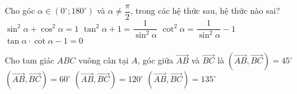 \begin{ex}%
Cho góc $\alpha \in \left(0^{\circ}; 180^{\circ} \right)$ và $\alpha \ne \dfrac{\pi}{2}$, trong các hệ thức sau, hệ thức nào sai?
\choice
{$\sin^2 \alpha + \cos ^2 \alpha =1$}
{\True $ \tan^2 \alpha + 1=\dfrac{1}{\sin^2 \alpha}$}
{$\cot^2 \alpha = \dfrac{1}{\sin^2 \alpha}-1$}
{$\tan \alpha \cdot \cot \alpha -1=0$}
\end{ex}
\begin{ex}%
Cho tam giác $ABC$ vuông cân tại $A$, góc giữa $\overrightarrow{AB}$ và $\overrightarrow{BC}$ là
\choice
{$\left( \overrightarrow{AB}, \overrightarrow{BC}\right)=45^{\circ} $}
{$\left( \overrightarrow{AB}, \overrightarrow{BC}\right)=60^{\circ} $}
{$\left( \overrightarrow{AB}, \overrightarrow{BC}\right)=120^{\circ} $}
{\True $\left( \overrightarrow{AB}, \overrightarrow{BC}\right)=135^{\circ} $}
\end{ex}

